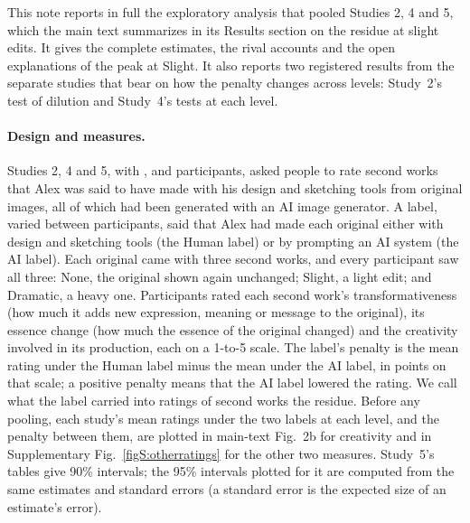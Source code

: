 
This note reports in full the exploratory analysis that pooled Studies 2, 4 and 5, which the main text summarizes in its Results section on the residue at slight edits. It gives the complete estimates, the rival accounts and the open explanations of the peak at Slight. It also reports two registered results from the separate studies that bear on how the penalty changes across levels: Study~2's test of dilution and Study~4's tests at each level.

\paragraph*{Design and measures.}
Studies 2, 4 and 5, with \STwoN, \SFourN{} and \SFiveN{} participants, asked people to rate second works that Alex was said to have made with his design and sketching tools from original images, all of which had been generated with an AI image generator. A label, varied between participants, said that Alex had made each original either with design and sketching tools (the Human label) or by prompting an AI system (the AI label). Each original came with three second works, and every participant saw all three: None, the original shown again unchanged; Slight, a light edit; and Dramatic, a heavy one. Participants rated each second work's transformativeness (how much it adds new expression, meaning or message to the original), its essence change (how much the essence of the original changed) and the creativity involved in its production, each on a 1-to-5 scale. The label's penalty is the mean rating under the Human label minus the mean under the AI label, in points on that scale; a positive penalty means that the AI label lowered the rating. We call what the label carried into ratings of second works the residue. Before any pooling, each study's mean ratings under the two labels at each level, and the penalty between them, are plotted in main-text Fig.~2b for creativity and in Supplementary Fig.~\ref{figS:otherratings} for the other two measures. Study~5's tables give 90\% intervals; the 95\% intervals plotted for it are computed from the same estimates and standard errors (a standard error is the expected size of an estimate's error).

